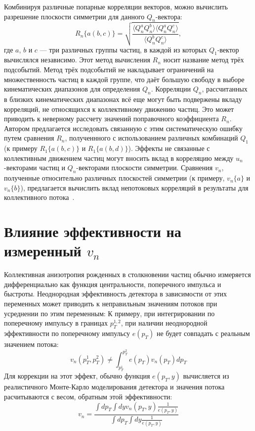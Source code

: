 Комбинируя различные попарные корреляции векторов, можно вычислить разрешение плоскости симметрии для данного $Q_n$-вектора:
%
\begin{equation}
    R_n\{a(b,c)\}  =  \sqrt { \frac{ \langle Q_n^a Q_n^b \rangle \langle Q_n^a Q_n^c \rangle }{ \langle Q_n^b Q_n^c \rangle} },
\end{equation}
%
где $a$, $b$ и $c$ --- три различных группы частиц, в каждой из которых $Q_1$-вектор вычислялся независимо.
Этот метод вычисления $R_n$ носит название метод трёх подсобытий.
Метод трёх подсобытий не накладывает ограничений на множественность частиц в каждой группе, что даёт большую свободу в выборе кинематических диапазонов для определения $Q_n$.
Корреляции $Q_n$, рассчитанных в близких кинематических диапазонах всё еще могут быть подвержены вкладу корреляций, не относящихся к коллективному движению частиц.
Это может приводить к неверному рассчету значений поправочного коэффициента $R_n$.
Автором предлагается исследовать связанную с этим систематическую ошибку путем сравнения $R_n$, полученнного с использованием различных комбинаций $Q_1$ (к примеру $R_1\{a(b,c)\}$ и $R_1\{a(b,d)\}$).
Эффекты не связанные с коллективным движением частиц могут вносить вклад в корреляцию между $u_n$-векторами частиц и $Q_n$-векторами плоскости симметрии.
Сравнения $v_n$, полученные относительно различных плоскостей симметрии (к примеру, $v_n\{a\}$ и $v_n\{b\}$), предлагается вычислить вклад непотоковых корреляций в результаты для коллективного потока~\cite{Mamaev:2020qom,Mamaev:2023fpr,Mamaev:2023yhz,Mamaev:2024}. 

\section{Влияние эффективности на измеренный $v_n$}

Коллективная анизотропия рожденных в столкновении частиц обычно измеряется дифференциально как функция центральности, поперечного импульса и быстроты.
Неоднородная эффективность детектора в зависимости от этих переменных может приводить к неправильным значениям потоков при усреднении по этим переменным:
К примеру, при интегрировании по поперечному импульсу в границах $p_T^{1,2}$, при наличии неоднородной эффективности по поперечному импульсу $e(p_T)$ не будет совпадать с реальным значением потока:
%
\begin{equation}
    v_n( p_T^{1}, p_T^{2} ) \ne \int_{p_T^1}^{p_T^2} e(p_T) v_n(p_T) dp_T 
    \label{eq:v1_formula}
\end{equation}
Для коррекции на этот эффект, обычно функция $e(p_T, y)$ вычисляется из реалистичного Монте-Карло моделирования детектора и значения потока расчитываются с весом, обратным этой эффективности:
%
\begin{equation}
    v_n = \frac{\int dp_T \int dy v_n(p_T, y) \frac{1}{e(p_T, y)} }{\int dp_T \int dy \frac{1}{e(p_T, y)} } 
    \label{eq:v1_formula}
\end{equation}

